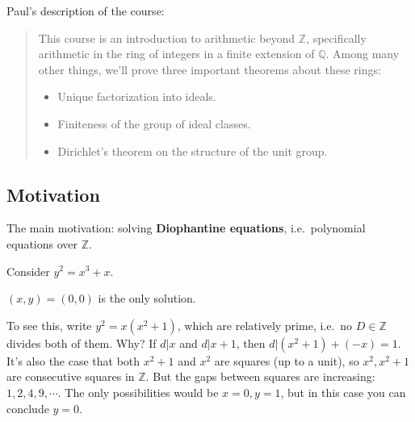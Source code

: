 Paul's description of the course:

\begin{quote}
This course is an introduction to arithmetic beyond \({\mathbb{Z}}\),
specifically arithmetic in the ring of integers in a finite extension of
\({\mathbb{Q}}\). Among many other things, we'll prove three important
theorems about these rings:

\begin{itemize}
\tightlist
\item
  Unique factorization into ideals.
\item
  Finiteness of the group of ideal classes.
\item
  Dirichlet's theorem on the structure of the unit group.
\end{itemize}
\end{quote}

\hypertarget{motivation}{%
\subsection{Motivation}\label{motivation}}

\begin{remark}

The main motivation: solving \textbf{Diophantine equations},
i.e.~polynomial equations over \({\mathbb{Z}}\).

\end{remark}

\begin{example}

Consider \(y^2 = x^3 + x\).

\begin{claim}

\((x, y) = (0, 0)\) is the only solution.

\end{claim}

To see this, write \(y^2 = x(x^2+1)\), which are relatively prime,
i.e.~no \(D\in {\mathbb{Z}}\) divides both of them. Why? If
\(d \mathrel{\Big|}x\) and \(d \mathrel{\Big|}x+1\), then
\(d\mathrel{\Big|}(x^2+1) + (-x) = 1\). It's also the case that both
\(x^2+1\) and \(x^2\) are squares (up to a unit), so \(x^2, x^2 + 1\)
are consecutive squares in \({\mathbb{Z}}\). But the gaps between
squares are increasing: \(1, 2, 4, 9, \cdots\). The only possibilities
would be \(x=0, y=1\), but in this case you can conclude \(y=0\).

\end{example}

